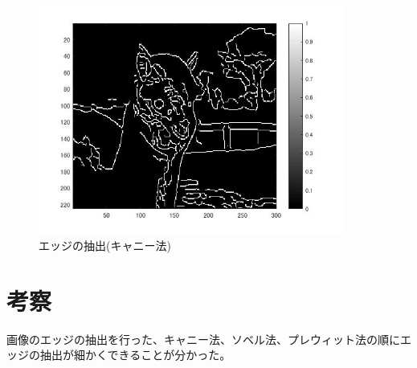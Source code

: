 \documentclass{jsarticle}
\begin{document}
\newpage
\begin{figure}[htbp]
 \begin{center}
  \includegraphics[width=10cm]{8-3.jpg}
 \end{center}
 \caption{エッジの抽出(キャニー法)}
\end{figure}

\section{考察}
画像のエッジの抽出を行った、キャニー法、ソベル法、プレウィット法の順にエッジの抽出が細かくできることが分かった。
\end{document}
